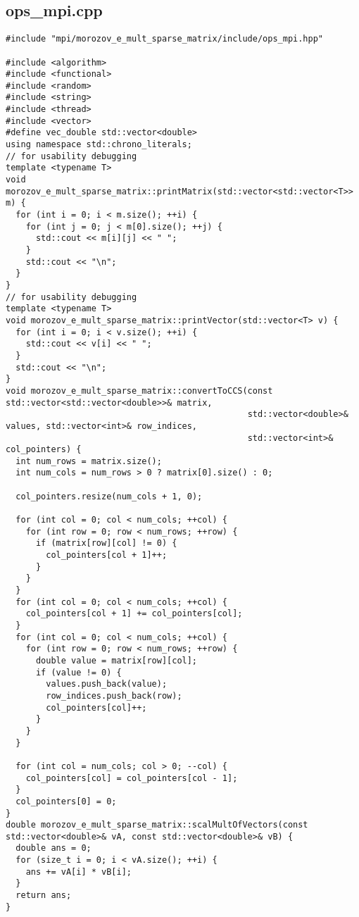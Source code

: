 \documentclass[a4paper,12pt]{article}
\begin{document}
\subsection{ops\_mpi.cpp}
\begin{lstlisting}
#include "mpi/morozov_e_mult_sparse_matrix/include/ops_mpi.hpp"

#include <algorithm>
#include <functional>
#include <random>
#include <string>
#include <thread>
#include <vector>
#define vec_double std::vector<double>
using namespace std::chrono_literals;
// for usability debugging
template <typename T>
void morozov_e_mult_sparse_matrix::printMatrix(std::vector<std::vector<T>> m) {
  for (int i = 0; i < m.size(); ++i) {
    for (int j = 0; j < m[0].size(); ++j) {
      std::cout << m[i][j] << " ";
    }
    std::cout << "\n";
  }
}
// for usability debugging
template <typename T>
void morozov_e_mult_sparse_matrix::printVector(std::vector<T> v) {
  for (int i = 0; i < v.size(); ++i) {
    std::cout << v[i] << " ";
  }
  std::cout << "\n";
}
void morozov_e_mult_sparse_matrix::convertToCCS(const std::vector<std::vector<double>>& matrix,
                                                std::vector<double>& values, std::vector<int>& row_indices,
                                                std::vector<int>& col_pointers) {
  int num_rows = matrix.size();
  int num_cols = num_rows > 0 ? matrix[0].size() : 0;

  col_pointers.resize(num_cols + 1, 0);

  for (int col = 0; col < num_cols; ++col) {
    for (int row = 0; row < num_rows; ++row) {
      if (matrix[row][col] != 0) {
        col_pointers[col + 1]++;
      }
    }
  }
  for (int col = 0; col < num_cols; ++col) {
    col_pointers[col + 1] += col_pointers[col];
  }
  for (int col = 0; col < num_cols; ++col) {
    for (int row = 0; row < num_rows; ++row) {
      double value = matrix[row][col];
      if (value != 0) {
        values.push_back(value);
        row_indices.push_back(row);
        col_pointers[col]++;
      }
    }
  }

  for (int col = num_cols; col > 0; --col) {
    col_pointers[col] = col_pointers[col - 1];
  }
  col_pointers[0] = 0;
}
double morozov_e_mult_sparse_matrix::scalMultOfVectors(const std::vector<double>& vA, const std::vector<double>& vB) {
  double ans = 0;
  for (size_t i = 0; i < vA.size(); ++i) {
    ans += vA[i] * vB[i];
  }
  return ans;
}


\end{lstlisting}
\end{document}
